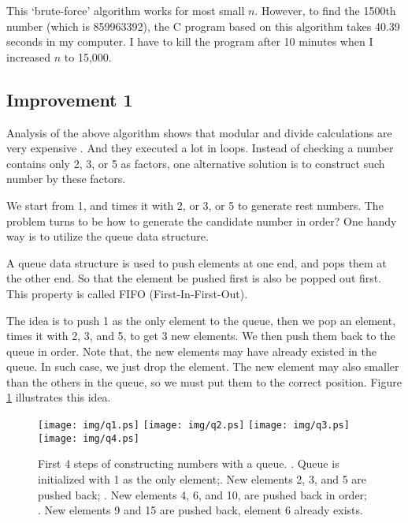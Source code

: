 \documentclass{article}
\begin{document}
This `brute-force' algorithm works for most small $n$. However, to find
the 1500th number (which is 859963392), the C program based on this
algorithm takes 40.39 seconds in my computer. I have to kill the program
after 10 minutes when I increased $n$ to 15,000.

\subsection{Improvement 1}
Analysis of the above algorithm shows that modular and divide calculations
are very expensive \cite{Bentley}. And they executed a lot in loops.
Instead of checking a number contains only 2, 3, or 5 as factors, one
alternative solution is to construct such number by these factors.

We start from 1, and times it with 2, or 3, or 5 to generate rest numbers.
The problem turns to be how to generate the candidate number in order?
One handy way is to utilize the queue data structure.

A queue data structure is used to push elements at one end, and pops
them at the other end. So that the element be pushed first is also
be popped out first. This property is called FIFO (First-In-First-Out).

The idea is to push 1 as the only element to the queue, then we pop
an element, times it with 2, 3, and 5, to get 3 new elements. We
then push them back to the queue in order. Note that, the new elements may
have already existed in the queue. In such case, we just drop the
element. The new element may also smaller than the others in the queue,
so we must put them to the correct position. Figure \ref{fig:queues}
illustrates this idea.

\begin{figure}[htbp]
       \begin{center}
       	  \texttt{[image: img/q1.ps]}
       	  \texttt{[image: img/q2.ps]}
       	  \texttt{[image: img/q3.ps]}
       	  \texttt{[image: img/q4.ps]}
        \caption{First 4 steps of constructing numbers with a queue. . Queue is initialized with 1 as the only element;. New elements 2, 3, and 5 are pushed back; . New elements 4, 6, and 10, are pushed back in order; . New elements 9 and 15 are pushed back, element 6 already exists.} \label{fig:queues}
       \end{center}
\end{figure}
\end{document}
